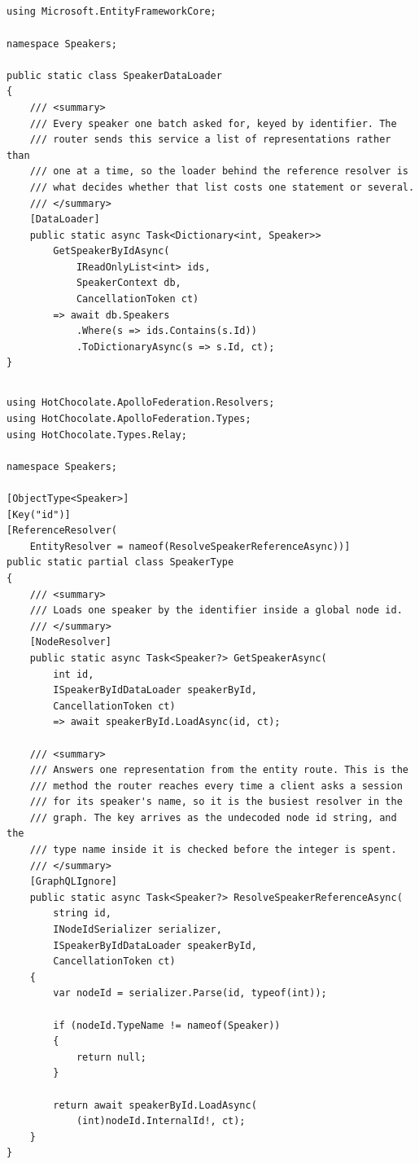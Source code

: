 \subsection*{}
\begin{verbatim}
using Microsoft.EntityFrameworkCore;

namespace Speakers;

public static class SpeakerDataLoader
{
    /// <summary>
    /// Every speaker one batch asked for, keyed by identifier. The
    /// router sends this service a list of representations rather than
    /// one at a time, so the loader behind the reference resolver is
    /// what decides whether that list costs one statement or several.
    /// </summary>
    [DataLoader]
    public static async Task<Dictionary<int, Speaker>>
        GetSpeakerByIdAsync(
            IReadOnlyList<int> ids,
            SpeakerContext db,
            CancellationToken ct)
        => await db.Speakers
            .Where(s => ids.Contains(s.Id))
            .ToDictionaryAsync(s => s.Id, ct);
}
\end{verbatim}

\subsection*{}
\begin{verbatim}
using HotChocolate.ApolloFederation.Resolvers;
using HotChocolate.ApolloFederation.Types;
using HotChocolate.Types.Relay;

namespace Speakers;

[ObjectType<Speaker>]
[Key("id")]
[ReferenceResolver(
    EntityResolver = nameof(ResolveSpeakerReferenceAsync))]
public static partial class SpeakerType
{
    /// <summary>
    /// Loads one speaker by the identifier inside a global node id.
    /// </summary>
    [NodeResolver]
    public static async Task<Speaker?> GetSpeakerAsync(
        int id,
        ISpeakerByIdDataLoader speakerById,
        CancellationToken ct)
        => await speakerById.LoadAsync(id, ct);

    /// <summary>
    /// Answers one representation from the entity route. This is the
    /// method the router reaches every time a client asks a session
    /// for its speaker's name, so it is the busiest resolver in the
    /// graph. The key arrives as the undecoded node id string, and the
    /// type name inside it is checked before the integer is spent.
    /// </summary>
    [GraphQLIgnore]
    public static async Task<Speaker?> ResolveSpeakerReferenceAsync(
        string id,
        INodeIdSerializer serializer,
        ISpeakerByIdDataLoader speakerById,
        CancellationToken ct)
    {
        var nodeId = serializer.Parse(id, typeof(int));

        if (nodeId.TypeName != nameof(Speaker))
        {
            return null;
        }

        return await speakerById.LoadAsync(
            (int)nodeId.InternalId!, ct);
    }
}
\end{verbatim}

